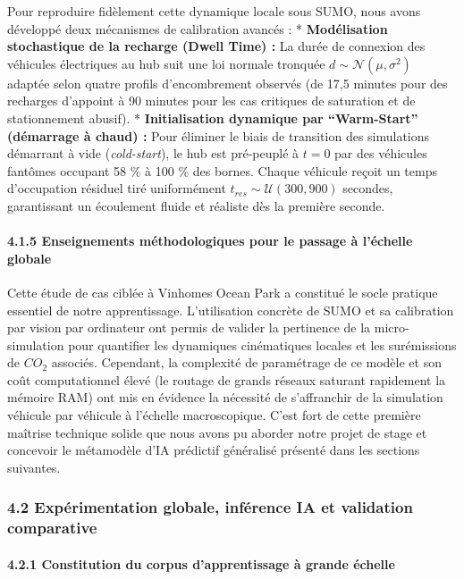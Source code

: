 \documentclass[10pt, a4paper]{article}
\begin{document}
Pour reproduire fidèlement cette dynamique locale sous SUMO, nous avons
développé deux mécanismes de calibration avancés : *
\textbf{Modélisation stochastique de la recharge (Dwell Time) :} La
durée de connexion des véhicules électriques au hub suit une loi normale
tronquée \(d \sim \mathcal{N}(\mu, \sigma^2)\) adaptée selon quatre
profils d'encombrement observés (de 17,5 minutes pour des recharges
d'appoint à 90 minutes pour les cas critiques de saturation et de
stationnement abusif). * \textbf{Initialisation dynamique par
``Warm-Start'' (démarrage à chaud) :} Pour éliminer le biais de
transition des simulations démarrant à vide (\emph{cold-start}), le hub
est pré-peuplé à \(t=0\) par des véhicules fantômes occupant 58 \% à 100
\% des bornes. Chaque véhicule reçoit un temps d'occupation résiduel
tiré uniformément \(t_{res} \sim \mathcal{U}(300, 900)\) secondes,
garantissant un écoulement fluide et réaliste dès la première seconde.

\paragraph{4.1.5 Enseignements méthodologiques pour le passage à
l'échelle
globale}\label{enseignements-muxe9thodologiques-pour-le-passage-uxe0-luxe9chelle-globale}

Cette étude de cas ciblée à Vinhomes Ocean Park a constitué le socle
pratique essentiel de notre apprentissage. L'utilisation concrète de
SUMO et sa calibration par vision par ordinateur ont permis de valider
la pertinence de la micro-simulation pour quantifier les dynamiques
cinématiques locales et les surémissions de \(CO_2\) associés.
Cependant, la complexité de paramétrage de ce modèle et son coût
computationnel élevé (le routage de grands réseaux saturant rapidement
la mémoire RAM) ont mis en évidence la nécessité de s'affranchir de la
simulation véhicule par véhicule à l'échelle macroscopique. C'est fort
de cette première maîtrise technique solide que nous avons pu aborder
notre projet de stage et concevoir le métamodèle d'IA prédictif
généralisé présenté dans les sections suivantes.

\subsubsection{4.2 Expérimentation globale, inférence IA et validation
comparative}\label{expuxe9rimentation-globale-infuxe9rence-ia-et-validation-comparative}

\paragraph{4.2.1 Constitution du corpus d'apprentissage à grande
échelle}\label{constitution-du-corpus-dapprentissage-uxe0-grande-uxe9chelle}
\end{document}
